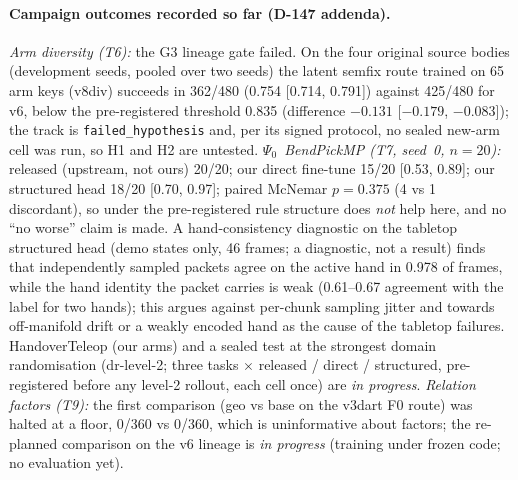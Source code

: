 \documentclass[10pt,twocolumn]{article}
\begin{document}
\paragraph{Campaign outcomes recorded so far (D-147 addenda).} \emph{Arm diversity (T6):} the G3 lineage gate failed. On the four original source bodies (development seeds, pooled over two seeds) the latent semfix route trained on 65 arm keys (v8div) succeeds in 362/480 (0.754 [0.714, 0.791]) against 425/480 for v6, below the pre-registered threshold 0.835 (difference $-0.131$ [$-0.179$, $-0.083$]); the track is \texttt{failed\_hypothesis} and, per its signed protocol, no sealed new-arm cell was run, so H1 and H2 are untested. \emph{$\Psi_0$~BendPickMP (T7, seed~0, $n{=}20$):} released (upstream, not ours) 20/20; our direct fine-tune 15/20 [0.53, 0.89]; our structured head 18/20 [0.70, 0.97]; paired McNemar $p{=}0.375$ (4 vs 1 discordant), so under the pre-registered rule structure does \emph{not} help here, and no ``no worse'' claim is made. A hand-consistency diagnostic on the tabletop structured head (demo states only, 46 frames; a diagnostic, not a result) finds that independently sampled packets agree on the active hand in 0.978 of frames, while the hand identity the packet carries is weak (0.61--0.67 agreement with the label for two hands); this argues against per-chunk sampling jitter and towards off-manifold drift or a weakly encoded hand as the cause of the tabletop failures. HandoverTeleop (our arms) and a sealed test at the strongest domain randomisation (dr-level-2; three tasks $\times$ released / direct / structured, pre-registered before any level-2 rollout, each cell once) are \emph{in progress}. \emph{Relation factors (T9):} the first comparison (geo vs base on the v3dart F0 route) was halted at a floor, 0/360 vs 0/360, which is uninformative about factors; the re-planned comparison on the v6 lineage is \emph{in progress} (training under frozen code; no evaluation yet).
\end{document}
